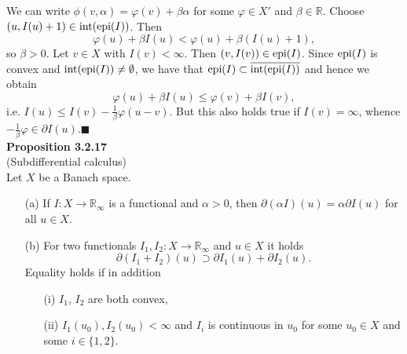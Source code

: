 We can write $\phi(v,\alpha)=\varphi(v)+\beta\alpha$ for some $\varphi\in X'$ and $\beta\in\mathbb{R}$. Choose $(u,I(u)+1)\in\operatorname{int}\mathopen{}\left(\operatorname{epi}\mathopen{}\left(I\right)\mathclose{}\right)\mathclose{}$. Then
\[\varphi(u)+\beta I(u)<\varphi(u)+\beta(I(u)+1),\]
so $\beta>0$. Let $v\in X$ with $I(v)<\infty$. Then $(v,I(v))\in\operatorname{epi}\mathopen{}\left(I\right)\mathclose{}$. Since $\operatorname{epi}\mathopen{}\left(I\right)\mathclose{}$ is convex and $\operatorname{int}\mathopen{}\left(\operatorname{epi}\mathopen{}\left(I\right)\mathclose{}\right)\mathclose{}\ne\emptyset$, we have that $\operatorname{epi}\mathopen{}\left(I\right)\mathclose{}\subset\overline{\operatorname{int}\mathopen{}\left(\operatorname{epi}\mathopen{}\left(I\right)\mathclose{}\right)\mathclose{}}$ and hence we obtain
\[\varphi(u)+\beta I(u)\leq\varphi(v)+\beta I(v),\]
i.e. $I(u)\leq I(v)-\frac{1}{\beta}\varphi(u-v)$. But this also holds true if $I(v)=\infty$, whence $-\frac{1}{\beta}\varphi\in\partial I(u)$.\hfill$\blacksquare$\\[11pt]

\textbf{Proposition 3.2.17}\\
(Subdifferential calculus)\\
Let $X$ be a Banach space.
\begin{itemize}
	\item[(a)] If $I:X\longrightarrow\mathbb{R}_\infty$ is a functional and $\alpha>0$, then $\partial(\alpha I)(u)=\alpha\partial I(u)$ for all $u\in X$.
	\item[(b)] For two functionals $I_1,I_2:X\longrightarrow\mathbb{R}_\infty$ and $u\in X$ it holds
	\[\partial(I_1+I_2)(u)\supset\partial I_1(u)+\partial I_2(u).\]
	Equality holds if in addition
	\begin{itemize}
		\item[(i)] $I_1$, $I_2$ are both convex,
		\item[(ii)] $I_1(u_0),I_2(u_0)<\infty$ and $I_i$ is continuous in $u_0$ for some $u_0\in X$ and some $i\in\{1,2\}$.\\
	\end{itemize}
\end{itemize}

